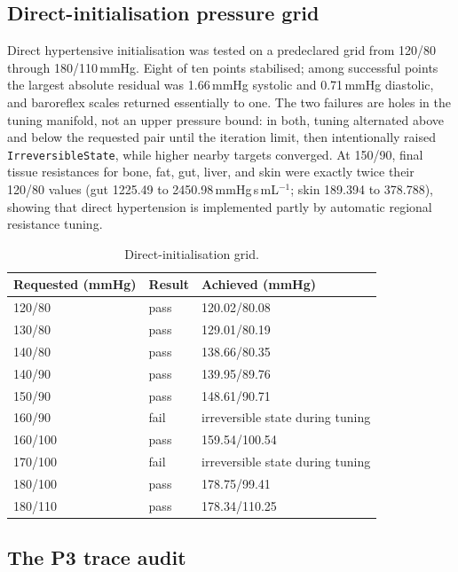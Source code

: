 \documentclass[preprint,12pt,nopreprintline]{elsarticle}
\begin{document}
\subsection{Direct-initialisation pressure grid}

Direct hypertensive initialisation was tested on a predeclared grid from 120/80 through 180/110\,mmHg. Eight of ten points stabilised; among successful points the largest absolute residual was 1.66\,mmHg systolic and 0.71\,mmHg diastolic, and baroreflex scales returned essentially to one. The two failures are holes in the tuning manifold, not an upper pressure bound: in both, tuning alternated above and below the requested pair until the iteration limit, then intentionally raised \texttt{IrreversibleState}, while higher nearby targets converged. At 150/90, final tissue resistances for bone, fat, gut, liver, and skin were exactly twice their 120/80 values (gut 1225.49 to 2450.98\,mmHg\,s\,mL$^{-1}$; skin 189.394 to 378.788), showing that direct hypertension is implemented partly by automatic regional resistance tuning.

\begin{table}[h]
\centering
\caption{Direct-initialisation grid.}
\label{tab:grid}
\begin{tabular}{lll}
\toprule
Requested (mmHg) & Result & Achieved (mmHg) \\
\midrule
120/80 & pass & 120.02/80.08 \\
130/80 & pass & 129.01/80.19 \\
140/80 & pass & 138.66/80.35 \\
140/90 & pass & 139.95/89.76 \\
150/90 & pass & 148.61/90.71 \\
160/90 & fail & irreversible state during tuning \\
160/100 & pass & 159.54/100.54 \\
170/100 & fail & irreversible state during tuning \\
180/100 & pass & 178.75/99.41 \\
180/110 & pass & 178.34/110.25 \\
\bottomrule
\end{tabular}
\end{table}

\subsection{The P3 trace audit}
\end{document}

